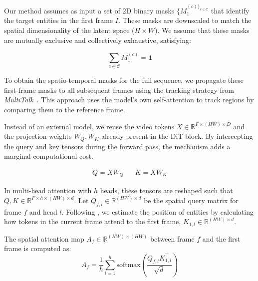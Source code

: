 \documentclass{article}
\begin{document}
Our method assumes as input a set of 2D binary masks $\{M_1^{(c)\}_{c\in\mathcal{C}}}$ that identify the target entities in the first frame $I$. These masks are downscaled to match the spatial dimensionality of the latent space ($H \times W$). We assume that these masks are mutually exclusive and collectively exhaustive, satisfying:

\begin{equation}\label{mece}
  \sum_{c \in \mathcal{C}} M^{(c)}_{1} = \mathbf{1}
\end{equation}

To obtain the spatio-temporal masks for the full sequence, we propagate these first-frame masks to all subsequent frames using the tracking strategy from \textit{MultiTalk}~\cite{kongLetThemTalk2025}. This approach uses the model's own self-attention to track regions by comparing them to the reference frame.

Instead of an external model, we reuse the video tokens $X \in \mathbb{R}^{F \times (HW) \times D}$ and the projection weights $W_Q, W_K$ already present in the DiT block. By intercepting the query and key tensors during the forward pass, the mechanism adds a marginal computational cost.


\begin{align}
Q = X W_Q && K = X W_K
\end{align}

In multi-head attention with $h$ heads, these tensors are reshaped such that $Q, K \in \mathbb{R}^{F \times h \times (HW) \times d}$. Let $Q_{f,l} \in \mathbb{R}^{(HW) \times d}$ be the spatial query matrix for frame $f$ and head $l$. Following \citet{kongLetThemTalk2025}, we estimate the position of entities by calculating how tokens in the current frame attend to the first frame, $K_{1,l} \in \mathbb{R}^{(HW) \times d}$.

The spatial attention map $A_f \in \mathbb{R}^{(HW) \times (HW)}$ between frame $f$ and the first frame is computed as:
\begin{equation}
    A_f = \frac{1}{h} \sum_{l=1}^{h} \text{softmax}\left(\frac{Q_{f,l} K_{1,l}^\top}{\sqrt{d}}\right)
\end{equation}
\end{document}
